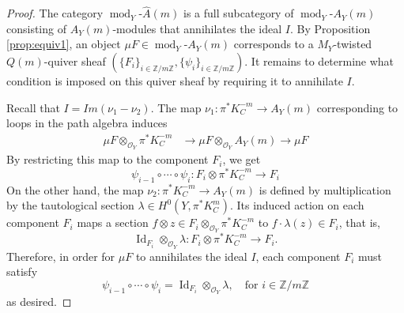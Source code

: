 \documentclass[10pt,a4paper]{amsart}
\def\O{\mathcal{O}}
\def\m{\mu}
\def\mod{\operatorname{mod}}
\def\wAm{\widehat{A}(m)}
\def\zm{\mathbb{Z}/m\mathbb{Z}}
\begin{document}
\begin{proof}
    The category $\mod_Y\!\text{-}\wAm$ is a full subcategory of $\mod_Y\!\text{-}A_Y(m)$ consisting of $A_Y(m)$-modules that annihilates the ideal $I$. By Proposition \ref{prop:equiv1}, an object $\m F\in \mod_Y\!\text{-}A_Y(m)$ corresponds to a $M_Y$-twisted $Q(m)$-quiver sheaf $(\{F_i\}_{i\in \zm}, \{\psi_i\}_{i\in \zm})$. It remains to determine what condition is imposed on this quiver sheaf by requiring it to annihilate $I$. 

    Recall that $I=Im(\nu_1-\nu_2)$. 
    The map $\nu_1: \pi^*K_C^{-m}\to A_Y(m)$ corresponding to loops in the path algebra induces
    \begin{align*}
    \m  F\otimes_{\O_Y} \pi^*K_C^{-m} &\to \m F\otimes_{\O_Y} A_Y(m) \to \m F
    \end{align*}
    By restricting this map to the component $F_i$, we get
    \[\psi_{i-1}\circ \cdots \circ \psi_i : F_i\otimes \pi^*K_C^{-m} \to F_i\]
    On the other hand, the map $\nu_2: \pi^*K_C^{-m}\to A_Y(m)$ is defined by multiplication by the tautological section $\lambda\in H^0(Y, \pi^*K_C^m)$. 
    Its induced action on each component $F_i$ maps a section $f\otimes z\in F_i\otimes_{\O_Y}\pi^*K_C^{-m}$ to $f\cdot \lambda(z)\in F_i$, that is, 
    \[\operatorname{Id}_{F_i}\otimes _{\O_Y}\lambda: F_i\otimes \pi^*K_C^{-m} \to F_i.\]
    Therefore, in order for $\m F$ to annihilates the ideal $I$, each component $F_i$ must satisfy
    \[\psi_{i-1}\circ \cdots \circ \psi_i = \operatorname{Id}_{F_i}\otimes_{\O_Y} \lambda  ,\quad \textrm{for } i\in \zm\]
    as desired.  
\end{proof}
\end{document}
